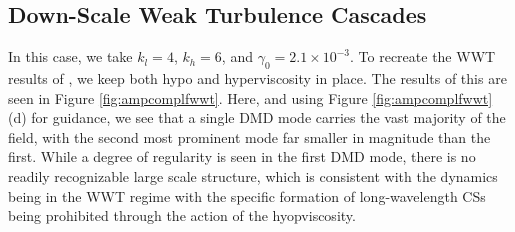 \documentclass[a4paper,11pt]{article}
\begin{document}
\subsection*{Down-Scale Weak Turbulence Cascades}
In this case, we take $k_{l}=4$, $k_{h}=6$, and $\gamma_{0}=2.1\times 10^{-3}$.  To recreate the WWT results of \cite{nazarenko2}, we keep both hypo and hyperviscosity in place.  The results of this are seen in Figure \ref{fig:ampcomplfwwt}.    Here, and using Figure \ref{fig:ampcomplfwwt} (d) for guidance, we see that a single DMD mode carries the vast majority of the field, with the second most prominent mode far smaller in magnitude than the first.  While a degree of regularity is seen in the first DMD mode, there is no readily recognizable large scale structure, which is consistent with the dynamics being in the WWT regime with the specific formation of long-wavelength CSs being prohibited through the action of the hyopviscosity.
\end{document}
